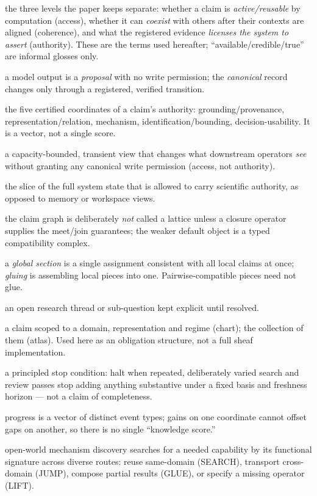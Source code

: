 \begin{description}[leftmargin=1.4em,style=nextline]
\item[Access, coherence, authority] the three levels the paper keeps separate: whether a claim is \emph{active/reusable} by computation (access), whether it can \emph{coexist} with others after their contexts are aligned (coherence), and what the registered evidence \emph{licenses the system to assert} (authority). These are the terms used hereafter; ``available/credible/true'' are informal glosses only.
\item[Proposal vs.\ canonical update] a model output is a \emph{proposal} with no write permission; the \emph{canonical} record changes only through a registered, verified transition.
\item[Authority vector $(G,R,M,I,D)$] the five certified coordinates of a claim's authority: grounding/provenance, representation/relation, mechanism, identification/bounding, decision-usability. It is a vector, not a single score.
\item[Workspace] a capacity-bounded, transient view that changes what downstream operators \emph{see} without granting any canonical write permission (access, not authority).
\item[Epistemic projection] the slice of the full system state that is allowed to carry scientific authority, as opposed to memory or workspace views.
\item[Compatibility complex vs.\ lattice] the claim graph is deliberately \emph{not} called a lattice unless a closure operator supplies the meet/join guarantees; the weaker default object is a typed compatibility complex.
\item[Gluing / global section] a \emph{global section} is a single assignment consistent with all local claims at once; \emph{gluing} is assembling local pieces into one. Pairwise-compatible pieces need not glue.
\item[Fiber] an open research thread or sub-question kept explicit until resolved.
\item[Chart / atlas] a claim scoped to a domain, representation and regime (chart); the collection of them (atlas). Used here as an obligation structure, not a full sheaf implementation.
\item[Bounded epistemic saturation] a principled stop condition: halt when repeated, deliberately varied search and review passes stop adding anything substantive under a fixed basis and freshness horizon --- not a claim of completeness.
\item[Non-compensatory growth vector] progress is a vector of distinct event types; gains on one coordinate cannot offset gaps on another, so there is no single ``knowledge score.''
\item[OWMD; SEARCH/JUMP/GLUE/LIFT] open-world mechanism discovery searches for a needed capability by its functional signature across diverse routes: reuse same-domain (SEARCH), transport cross-domain (JUMP), compose partial results (GLUE), or specify a missing operator (LIFT).
\end{description}

